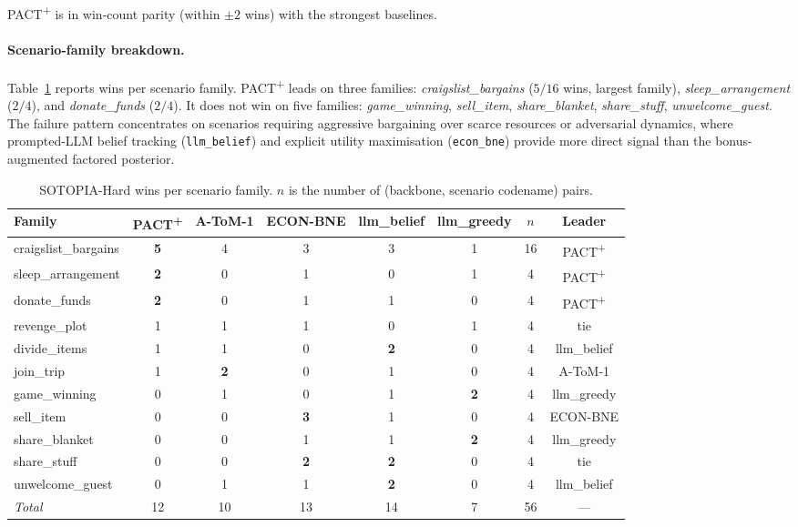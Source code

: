 PACT\textsuperscript{+} is in win-count parity (within $\pm 2$ wins) with the strongest baselines.

\paragraph{Scenario-family breakdown.} Table~\ref{tab:sotopia-family} reports wins per scenario family. PACT\textsuperscript{+} leads on three families: \emph{craigslist\_bargains} ($5/16$ wins, largest family), \emph{sleep\_arrangement} ($2/4$), and \emph{donate\_funds} ($2/4$). It does not win on five families: \emph{game\_winning}, \emph{sell\_item}, \emph{share\_blanket}, \emph{share\_stuff}, \emph{unwelcome\_guest}. The failure pattern concentrates on scenarios requiring aggressive bargaining over scarce resources or adversarial dynamics, where prompted-LLM belief tracking (\texttt{llm\_belief}) and explicit utility maximisation (\texttt{econ\_bne}) provide more direct signal than the bonus-augmented factored posterior.

\begin{table}[h]
\centering\small
\caption{SOTOPIA-Hard wins per scenario family. $n$ is the number of (backbone, scenario codename) pairs.}
\label{tab:sotopia-family}
\begin{tabular}{lccccccc}
\toprule
Family & PACT\textsuperscript{+} & A-ToM-1 & ECON-BNE & llm\_belief & llm\_greedy & $n$ & Leader \\
\midrule
craigslist\_bargains & \textbf{5} & 4 & 3 & 3 & 1 & 16 & PACT\textsuperscript{+} \\
sleep\_arrangement & \textbf{2} & 0 & 1 & 0 & 1 & 4 & PACT\textsuperscript{+} \\
donate\_funds & \textbf{2} & 0 & 1 & 1 & 0 & 4 & PACT\textsuperscript{+} \\
revenge\_plot & 1 & 1 & 1 & 0 & 1 & 4 & tie \\
divide\_items & 1 & 1 & 0 & \textbf{2} & 0 & 4 & llm\_belief \\
join\_trip & 1 & \textbf{2} & 0 & 1 & 0 & 4 & A-ToM-1 \\
game\_winning & 0 & 1 & 0 & 1 & \textbf{2} & 4 & llm\_greedy \\
sell\_item & 0 & 0 & \textbf{3} & 1 & 0 & 4 & ECON-BNE \\
share\_blanket & 0 & 0 & 1 & 1 & \textbf{2} & 4 & llm\_greedy \\
share\_stuff & 0 & 0 & \textbf{2} & \textbf{2} & 0 & 4 & tie \\
unwelcome\_guest & 0 & 1 & 1 & \textbf{2} & 0 & 4 & llm\_belief \\
\midrule
\emph{Total} & 12 & 10 & 13 & 14 & 7 & 56 & --- \\
\bottomrule
\end{tabular}
\end{table}


